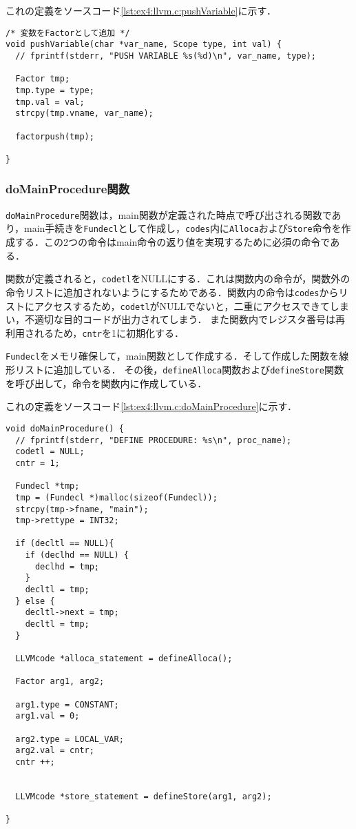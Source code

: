 \documentclass[uplatex]{jsarticle}
\begin{document}
これの定義をソースコード\ref{lst:ex4:llvm.c:pushVariable}に示す．

\begin{lstlisting}[caption=pushVariable関数の定義,label=lst:ex4:llvm.c:pushVariable]
/* 変数をFactorとして追加 */
void pushVariable(char *var_name, Scope type, int val) {
  // fprintf(stderr, "PUSH VARIABLE %s(%d)\n", var_name, type);

  Factor tmp;
  tmp.type = type;
  tmp.val = val;
  strcpy(tmp.vname, var_name);

  factorpush(tmp);

}
\end{lstlisting}

\subsubsection{doMainProcedure関数}
\verb#doMainProcedure#関数は，main関数が定義された時点で呼び出される関数であり，main手続きを\verb#Fundecl#として作成し，\verb#codes#内に\verb#Alloca#および\verb#Store#命令を作成する．この2つの命令はmain命令の返り値を実現するために必須の命令である．

関数が定義されると，\verb#codetl#をNULLにする．これは関数内の命令が，関数外の命令リストに追加されないようにするためである．関数内の命令は\verb#codes#からリストにアクセスするため，\verb#codetl#がNULLでないと，二重にアクセスできてしまい，不適切な目的コードが出力されてしまう．
また関数内でレジスタ番号は再利用されるため，\verb#cntr#を1に初期化する．

\verb#Fundecl#をメモリ確保して，main関数として作成する．そして作成した関数を線形リストに追加している．
その後，\verb#defineAlloca#関数および\verb#defineStore#関数を呼び出して，命令を関数内に作成している．

これの定義をソースコード\ref{lst:ex4:llvm.c:doMainProcedure}に示す．

\begin{lstlisting}[caption=doMainProcedure関数の定義,label=lst:ex4:llvm.c:doMainProcedure]
void doMainProcedure() {
  // fprintf(stderr, "DEFINE PROCEDURE: %s\n", proc_name);
  codetl = NULL;
  cntr = 1;

  Fundecl *tmp;
  tmp = (Fundecl *)malloc(sizeof(Fundecl));
  strcpy(tmp->fname, "main");
  tmp->rettype = INT32;

  if (decltl == NULL){
    if (declhd == NULL) {
      declhd = tmp;
    }
    decltl = tmp;
  } else {
    decltl->next = tmp;
    decltl = tmp;
  }

  LLVMcode *alloca_statement = defineAlloca();

  Factor arg1, arg2;

  arg1.type = CONSTANT;
  arg1.val = 0;

  arg2.type = LOCAL_VAR;
  arg2.val = cntr;
  cntr ++;


  LLVMcode *store_statement = defineStore(arg1, arg2);

}
\end{lstlisting}
\end{document}
